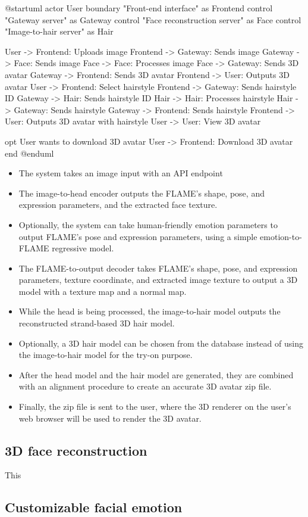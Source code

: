 \begin{umlfigure}
    @startuml
    actor User
    boundary "Front-end interface" as Frontend
    control "Gateway server" as Gateway
    control "Face reconstruction server" as Face
    control "Image-to-hair server" as Hair

    User -> Frontend: Uploads image
    Frontend -> Gateway: Sends image
    Gateway -> Face: Sends image
    Face -> Face: Processes image
    Face -> Gateway: Sends 3D avatar
    Gateway -> Frontend: Sends 3D avatar
    Frontend -> User: Outputs 3D avatar
    User -> Frontend: Select hairstyle
    Frontend -> Gateway: Sends hairstyle ID
    Gateway -> Hair: Sends hairstyle ID
    Hair -> Hair: Processes hairstyle
    Hair -> Gateway: Sends hairstyle
    Gateway -> Frontend: Sends hairstyle
    Frontend -> User: Outputs 3D avatar with hairstyle
    User -> User: View 3D avatar

    opt User wants to download 3D avatar
    User -> Frontend: Download 3D avatar
    end
    @enduml
\end{umlfigure}




\begin{itemize}
    \item The system takes an image input with an API endpoint
    \item The image-to-head encoder outputs the FLAME's shape, pose, and expression parameters, and the extracted face texture.
    \item Optionally, the system can take human-friendly emotion parameters to output FLAME's pose and expression parameters, using a simple emotion-to-FLAME regressive model.
    \item The FLAME-to-output decoder takes FLAME's shape, pose, and expression parameters, texture coordinate, and extracted image texture to output a 3D model with a texture map and a normal map.
    \item While the head is being processed, the image-to-hair model outputs the reconstructed strand-based 3D hair model.
    \item Optionally, a 3D hair model can be chosen from the database instead of using the image-to-hair model for the try-on purpose.
    \item After the head model and the hair model are generated, they are combined with an alignment procedure to create an accurate 3D avatar zip file.
    \item Finally, the zip file is sent to the user, where the 3D renderer on the user's web browser will be used to render the 3D avatar.
\end{itemize}


\subsection{3D face reconstruction}
This

\subsection{Customizable facial emotion}

